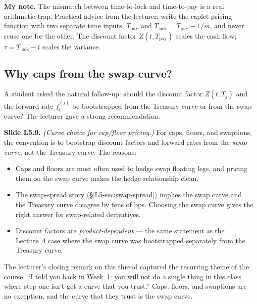 \begin{checkpoint}
\textbf{My note.} The mismatch between time-to-lock and time-to-pay is
a real arithmetic trap. Practical advice from the lecturer: write the
caplet pricing function with two separate time inputs, $T_{\text{pay}}$
and $T_{\text{lock}} = T_{\text{pay}} - 1/m$, and never reuse one for
the other. The discount factor $Z(t, T_{\text{pay}})$ scales the cash
flow; $\tau = T_{\text{lock}} - t$ scales the variance.
\end{checkpoint}

\subsection{Why caps from the swap curve?}\label{L5-sec:cap-curve}

A student asked the natural follow-up: should the discount factor
$Z(t, T_j)$ and the forward rate $f^{(j)}_t$ be bootstrapped from the
Treasury curve or from the swap curve? The lecturer gave a strong
recommendation.

\begin{keyblock}
\textbf{Slide L5.9.} \emph{(Curve choice for cap/floor pricing.)} For
caps, floors, and swaptions, the convention is to bootstrap discount
factors and forward rates from the \emph{swap curve}, not the
Treasury curve. The reasons:
\begin{itemize}
  \item Caps and floors are most often used to hedge swap floating
        legs, and pricing them on the swap curve makes the hedge
        relationship clean.
  \item The swap-spread story (\S\ref{L5-sec:swap-spread}) implies the
        swap curve and the Treasury curve disagree by tens of bps.
        Choosing the swap curve gives the right answer for swap-related
        derivatives.
  \item Discount factors are \emph{product-dependent} --- the same
        statement as the Lecture~4 case where the swap curve was
        bootstrapped separately from the Treasury curve.
\end{itemize}
\end{keyblock}

The lecturer's closing remark on this thread captured the recurring
theme of the course. ``I told you back in Week~1: you will not do a
single thing in this class where step one isn't get a curve that you
trust.'' Caps, floors, and swaptions are no exception, and the curve
that they trust is the swap curve.

